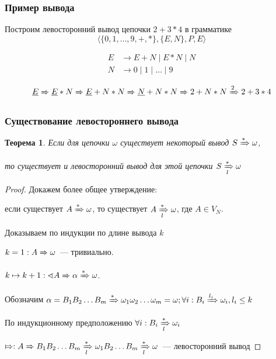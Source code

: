 \documentclass{beamer}
\newtheorem{rutheorem}{Теорема}
\newcommand{\derives}[1][*]{\xRightarrow[]{#1}}
\begin{document}
\begin{frame}[fragile]
  \transwipe[direction=90]
  \frametitle{Пример вывода}
  Построим левосторонний вывод цепочки $2+3*4$ в грамматике \[\langle \{ 0, 1, \dots, 9, +, *\}, \{E, N\}, P, E \rangle\]

\begin{align*}
  E &\to E + N \mid E * N \mid N \\
  N &\to 0 \mid 1  \mid \dots \mid 9
\end{align*}

\[ \underline{E} \derives[]  \underline{E} * N \derives[] \underline{E} + N * N \derives[] \underline{N} + N * N \derives[] 2 + N * N \derives[2] 2 + 3 * 4\]
\end{frame}

\begin{frame}[fragile]
  \transwipe[direction=90]
  \frametitle{Существование левостороннего вывода}
  \begin{rutheorem}
    Если для цепочки $\omega$ существует некоторый вывод $S \derives \omega$,

    то существует и левосторонний вывод для этой цепочки $S \xRightarrow[l]{*} \omega$
  \end{rutheorem}
  \begin{proof}
  Докажем более общее утверждение:

  если существует $A \derives \omega$, то существует $A \xRightarrow[l]{*} \omega$, где $A \in V_N$.

  Доказываем по индукции по длине вывода $k$

    $k = 1: A \derives[] \omega$~--- тривиально.

  $k \mapsto k + 1: \sphericalangle A \derives[] \alpha \derives \omega$.

  Обозначим $ \alpha = B_1 B_2 \dots B_m \derives \omega_1 \omega_2 \dots \omega_m = \omega; \forall i: B_i \xRightarrow[]{l_i} \omega_i, l_i \leq k$

  По индукционному предположению $\forall i: B_i \xRightarrow[l]{*} \omega_i$

  $\Mapsto: A \derives[] B_1 B_2 \dots B_m \xRightarrow[l]{*} \omega_1  B_2 \dots B_m \xRightarrow[l]{*} \omega$~--- левосторонний вывод
  \end{proof}
\end{frame}
\end{document}
